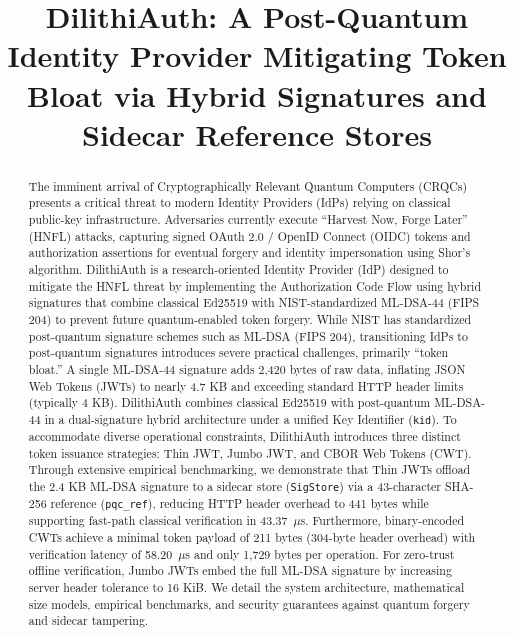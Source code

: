 \documentclass[conference]{IEEEtran}
\begin{document}
\title{DilithiAuth: A Post-Quantum Identity Provider Mitigating Token Bloat via Hybrid Signatures and Sidecar Reference Stores}

\author{
}

\maketitle

\begin{abstract}
The imminent arrival of Cryptographically Relevant Quantum Computers (CRQCs) presents a critical threat to modern Identity Providers (IdPs) relying on classical public-key infrastructure. Adversaries currently execute ``Harvest Now, Forge Later'' (HNFL) attacks, capturing signed OAuth 2.0 / OpenID Connect (OIDC) tokens and authorization assertions for eventual forgery and identity impersonation using Shor's algorithm. DilithiAuth is a research-oriented Identity Provider (IdP) designed to mitigate the HNFL threat by implementing the Authorization Code Flow using hybrid signatures that combine classical Ed25519 with NIST-standardized ML-DSA-44 (FIPS 204) to prevent future quantum-enabled token forgery. While NIST has standardized post-quantum signature schemes such as ML-DSA (FIPS 204), transitioning IdPs to post-quantum signatures introduces severe practical challenges, primarily ``token bloat.'' A single ML-DSA-44 signature adds 2,420 bytes of raw data, inflating JSON Web Tokens (JWTs) to nearly 4.7 KB and exceeding standard HTTP header limits (typically 4 KB). DilithiAuth combines classical Ed25519 with post-quantum ML-DSA-44 in a dual-signature hybrid architecture under a unified Key Identifier (\texttt{kid}). To accommodate diverse operational constraints, DilithiAuth introduces three distinct token issuance strategies: Thin JWT, Jumbo JWT, and CBOR Web Tokens (CWT). Through extensive empirical benchmarking, we demonstrate that Thin JWTs offload the 2.4 KB ML-DSA signature to a sidecar store (\texttt{SigStore}) via a 43-character SHA-256 reference (\texttt{pqc\_ref}), reducing HTTP header overhead to 441 bytes while supporting fast-path classical verification in 43.37~$\mu$s. Furthermore, binary-encoded CWTs achieve a minimal token payload of 211 bytes (304-byte header overhead) with verification latency of 58.20~$\mu$s and only 1,729 bytes per operation. For zero-trust offline verification, Jumbo JWTs embed the full ML-DSA signature by increasing server header tolerance to 16 KiB. We detail the system architecture, mathematical size models, empirical benchmarks, and security guarantees against quantum forgery and sidecar tampering.
\end{abstract}
\end{document}
